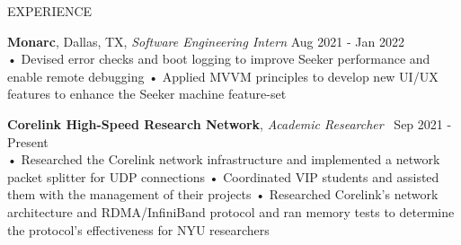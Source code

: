 \documentclass{resume} %
\begin{document}
\begin{rSection}{EXPERIENCE}

\textbf{\bf Monarc}, Dallas, TX, {\emph{Software Engineering Intern}} \hfill Aug 2021 - Jan 2022\\
• Devised error checks and boot logging to improve Seeker performance and enable remote debugging \newline
• Applied MVVM principles to develop new UI/UX features to enhance the Seeker machine feature-set \smallskip

\textbf{\bf Corelink High-Speed Research Network}, {\emph{Academic Researcher}} \ \hfill Sep 2021 - Present \\%
• Researched the Corelink network infrastructure and implemented a network packet splitter for UDP connections \newline
• Coordinated VIP students and assisted them with the management of their projects \newline
• Researched Corelink’s network architecture and RDMA/InfiniBand protocol and ran memory tests to determine the protocol's effectiveness for NYU researchers

\end{rSection} 
\end{document}
